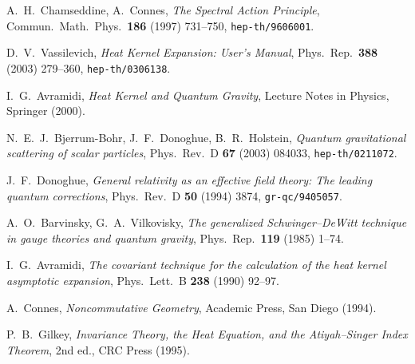 \documentclass[12pt,a4paper]{article}
\theoremstyle{definition}
\theoremstyle{remark}
\begin{document}
\begin{enumerate}[label={[\arabic*]},leftmargin=2.5em]
\item A.~H.~Chamseddine, A.~Connes,
  \emph{The Spectral Action Principle},
  Commun.\ Math.\ Phys.\ \textbf{186} (1997) 731--750,
  \texttt{hep-th/9606001}.

\item D.~V.~Vassilevich,
  \emph{Heat Kernel Expansion: User's Manual},
  Phys.\ Rep.\ \textbf{388} (2003) 279--360,
  \texttt{hep-th/0306138}.

\item I.~G.~Avramidi,
  \emph{Heat Kernel and Quantum Gravity},
  Lecture Notes in Physics, Springer (2000).

\item N.~E.~J.~Bjerrum-Bohr, J.~F.~Donoghue, B.~R.~Holstein,
  \emph{Quantum gravitational scattering of scalar particles},
  Phys.\ Rev.\ D \textbf{67} (2003) 084033,
  \texttt{hep-th/0211072}.

\item J.~F.~Donoghue,
  \emph{General relativity as an effective field theory: The leading
  quantum corrections},
  Phys.\ Rev.\ D \textbf{50} (1994) 3874,
  \texttt{gr-qc/9405057}.

\item A.~O.~Barvinsky, G.~A.~Vilkovisky,
  \emph{The generalized Schwinger--DeWitt technique in gauge theories
  and quantum gravity},
  Phys.\ Rep.\ \textbf{119} (1985) 1--74.

\item I.~G.~Avramidi,
  \emph{The covariant technique for the calculation of the heat kernel
  asymptotic expansion},
  Phys.\ Lett.\ B \textbf{238} (1990) 92--97.

\item A.~Connes,
  \emph{Noncommutative Geometry},
  Academic Press, San Diego (1994).

\item P.~B.~Gilkey,
  \emph{Invariance Theory, the Heat Equation, and the Atiyah--Singer
  Index Theorem}, 2nd ed., CRC Press (1995).
\end{enumerate}
\end{document}
